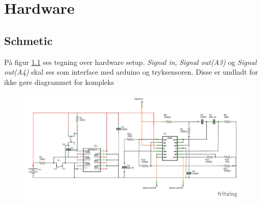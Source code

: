 \newpage
\chapter{Hardware}

\section{Schmetic}
På figur \ref{fig:schematics} ses tegning over hardware setup. \textit{Signal in}, \textit{Signal out(A3)} og \textit{Signal out(A4)} skal ses som interface med arduino og tryksensoren. Disse er undladt for ikke gøre diagrammet for kompleks
\begin{figure}[H]
	\includegraphics[trim = 0 30 0 0, clip=true, width = \textwidth]{billeder/Konditionering_schem.pdf}
	\caption{}\label{fig:schematics}
\end{figure}

\newpage
